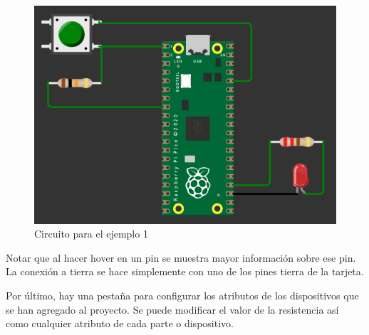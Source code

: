 \documentclass{article}
\begin{document}
    \begin{figure}[H]
        \centering
        \includegraphics[width=0.4\paperwidth]{images/wokwi-example-1-circuit}
        \caption{Circuito para el ejemplo 1}
    \end{figure}

    Notar que al hacer hover en un pin se muestra mayor información sobre ese
    pin. La conexión a tierra se hace simplemente con uno de los pines tierra
    de la tarjeta.

    \bigbreak

    Por último, hay una pestaña para configurar los atributos de los
    dispositivos que se han agregado al proyecto. Se puede modificar el valor
    de la resistencia así como cualquier atributo de cada parte o dispositivo.
\end{document}
